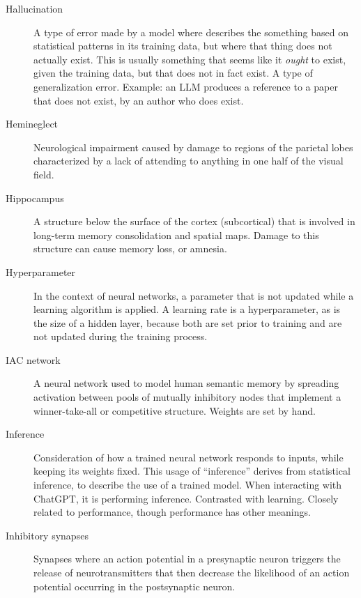 \begin{description}
\item[Hallucination] A type of error made by a model where describes the something based on statistical patterns in its training data, but where that thing does not actually exist. This is usually something that seems like it \emph{ought} to exist, given the training data, but that does not in fact exist. A type of generalization error. Example: an LLM produces a reference to a paper that does not exist, by an author who does exist.

\item[Hemineglect] Neurological impairment caused by damage to regions of the parietal lobes characterized by a lack of attending to anything in one half of the visual field.

\item[Hippocampus] A structure below the surface of the cortex (subcortical) that is involved in long-term memory consolidation and spatial maps. Damage to this structure can cause memory loss, or amnesia. 


\item[Hyperparameter] In the context of neural networks, a parameter that is not updated while a learning algorithm is applied. A learning rate is a hyperparameter, as is the size of a hidden layer, because both are set prior to training and are not updated during the training process.

\item[IAC network] A neural network used to model human semantic memory by spreading activation between pools of mutually inhibitory nodes that implement a winner-take-all or competitive structure. Weights are set by hand. 

\item[Inference] Consideration of how a trained neural network responds to inputs, while keeping its weights fixed. This usage of ``inference'' derives from statistical inference, to describe the use of a trained model. When interacting with ChatGPT, it is performing inference. Contrasted with learning.  Closely related to performance, though performance has other meanings.

\item[Inhibitory synapses] Synapses where an action potential in a presynaptic neuron triggers the release of neurotransmitters that then decrease the likelihood of an action potential occurring in the postsynaptic neuron.


\end{description}
